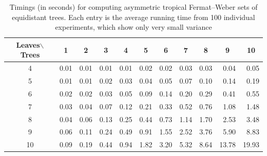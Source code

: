 \documentclass[a4paper,12pt]{amsart}
\theoremstyle{remark}
\begin{document}
\begin{table}
  \caption{Timings (in seconds) for computing asymmetric tropical Fermat--Weber sets of equidistant trees.
    Each entry is the average running time from 100 individual experiments, which show only very small variance}
\label{table:asym-times}
\centering
\begin{tabular}{crrrrrrrrrr}
 \toprule
 Leaves$\backslash$Trees & \multicolumn{1}{c}{1} & \multicolumn{1}{c}{2} & \multicolumn{1}{c}{3} & \multicolumn{1}{c}{4} & \multicolumn{1}{c}{5} & \multicolumn{1}{c}{6} & \multicolumn{1}{c}{7} & \multicolumn{1}{c}{8} & \multicolumn{1}{c}{9} & \multicolumn{1}{c}{10}  \\
 \midrule
 4 & 0.01 & 0.01 & 0.01 & 0.01 & 0.02 & 0.02 & 0.03 & 0.03 & 0.04 & 0.05 \\ 
 5 & 0.01 & 0.01 & 0.02 & 0.03 & 0.04 & 0.05 & 0.07 & 0.10 & 0.14 & 0.19 \\ 
 6 & 0.02 & 0.02 & 0.03 & 0.05 & 0.09 & 0.14 & 0.20 & 0.29 & 0.41 & 0.55 \\ 
 7 & 0.03 & 0.04 & 0.07 & 0.12 & 0.21 & 0.33 & 0.52 & 0.76 & 1.08 & 1.48 \\ 
 8 & 0.04 & 0.06 & 0.13 & 0.25 & 0.44 & 0.73 & 1.14 & 1.70 & 2.53 & 3.48 \\ 
 9 & 0.06 & 0.11 & 0.24 & 0.49 & 0.91 & 1.55 & 2.52 & 3.76 & 5.90 & 8.83 \\ 
 10 & 0.09 & 0.19 & 0.44 & 0.94 & 1.82 & 3.20 & 5.32 & 8.64 & 13.78 & 19.93 \\ 
\bottomrule 
\end{tabular} 
\end{table}
\end{document}

